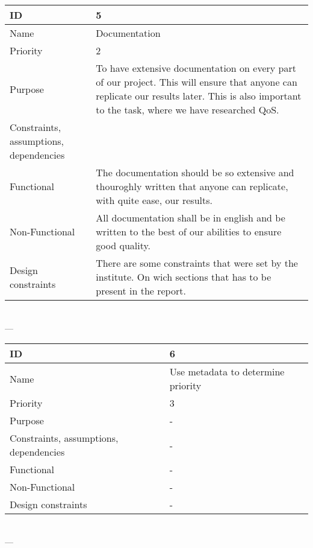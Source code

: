 \begin{center}
    \begin{tabular}{| p{4cm} | p{8cm} |}
        \hline
        ID & 5 \\
        \hline
        Name & Documentation  \\
        \hline
        Priority & 2 \\
        \hline
        Purpose & To have extensive documentation on every part of our project. This will ensure that anyone can replicate our results later. This is also important to the task, where we have researched QoS. \\
        \hline 
        Constraints, assumptions, dependencies &  \\
        \hline  
        Functional & The documentation should be so extensive and thouroghly written that anyone can replicate, with quite ease, our results. \\
        \hline
        Non-Functional & All documentation shall be in english and be written to the best of our abilities to ensure good quality. \\ 
        \hline
        Design constraints & There are some constraints that were set by the institute. On wich sections that has to be present in the report. \\
        \hline
    \end{tabular}
    \\  ---  \\
    
    \begin{tabular}{| p{4cm} | p{8cm} |}
        \hline
        ID & 6 \\
        \hline
        Name & Use metadata to determine priority  \\
        \hline
        Priority & 3 \\
        \hline
        Purpose & - \\
        \hline 
        Constraints, assumptions, dependencies & - \\
        \hline  
        Functional & -\\
        \hline
        Non-Functional & -\\ 
        \hline
        Design constraints & -\\
        \hline
    \end{tabular}
    \\  ---  \\
    

\end{center}
